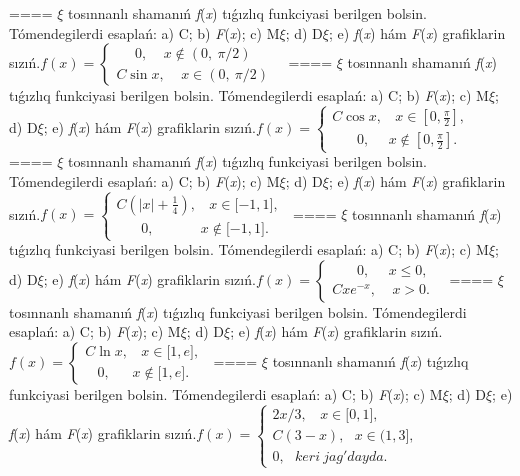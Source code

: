 ====
$\xi$ tosınnanlı shamanıń \emph{f}(\emph{x}) tıǵızlıq funkciyasi berilgen bolsin. Tómendegilerdi esaplań: a) C; b) \emph{F}(\emph{x}); c) M$\xi$; d) D$\xi$; e) \emph{f}(\emph{x}) hám \emph{F}(\emph{x}) grafiklarin sızıń.\(f(x) = \left\{ \begin{matrix}
\ \ \ \ \ \ 0,\ \ \ \ \ x \notin (0,\ \pi/2)\ \  \\
C\sin x,\ \ \ \ \ x \in (0,\ \pi/2)\ \ 
\end{matrix} \right.\ \)
====
$\xi$ tosınnanlı shamanıń \emph{f}(\emph{x}) tıǵızlıq funkciyasi berilgen bolsin. Tómendegilerdi esaplań: a) C; b) \emph{F}(\emph{x}); c) M$\xi$; d) D$\xi$; e) \emph{f}(\emph{x}) hám \emph{F}(\emph{x}) grafiklarin sızıń.\(f(x) = \left\{ \begin{matrix}
C\cos x,\ \ \ \ x \in \left\lbrack 0,\frac{\pi}{2} \right\rbrack, \\
\ \ \ \ \ \ \ \ 0,\ \ \ \ \ \ x \notin \left\lbrack 0,\frac{\pi}{2} \right\rbrack.\ \ 
\end{matrix} \right.\ \)
====
$\xi$ tosınnanlı shamanıń \emph{f}(\emph{x}) tıǵızlıq funkciyasi berilgen bolsin. Tómendegilerdi esaplań: a) C; b) \emph{F}(\emph{x}); c) M$\xi$; d) D$\xi$; e) \emph{f}(\emph{x}) hám \emph{F}(\emph{x}) grafiklarin sızıń.\(f(x) = \left\{ \begin{matrix}
C\left( |x| + \frac{1}{4} \right),\ \ \ \ x \in \lbrack - 1,1\rbrack, \\
\ \ \ \ \ \ \ \ 0,\ \ \ \ \ \ \ \ \ \ \ \ \ \ \ x \notin \lbrack - 1,1\rbrack.\ \ 
\end{matrix} \right.\ \)
====
$\xi$ tosınnanlı shamanıń \emph{f}(\emph{x}) tıǵızlıq funkciyasi berilgen bolsin. Tómendegilerdi esaplań: a) C; b) \emph{F}(\emph{x}); c) M$\xi$; d) D$\xi$; e) \emph{f}(\emph{x}) hám \emph{F}(\emph{x}) grafiklarin sızıń.\(f(x) = \left\{ \begin{matrix}
\ \ \ \ \ \ \ \ 0,\ \ \ \ \ \ x \leq 0, \\
Cxe^{- x},\ \ \ \ \ x > 0.\ \ 
\end{matrix} \right.\ \)
====
$\xi$ tosınnanlı shamanıń \emph{f}(\emph{x}) tıǵızlıq funkciyasi berilgen bolsin. Tómendegilerdi esaplań: a) C; b) \emph{F}(\emph{x}); c) M$\xi$; d) D$\xi$; e) \emph{f}(\emph{x}) hám \emph{F}(\emph{x}) grafiklarin sızıń.\(f(x) = \left\{ \begin{matrix}
C\ln x,\ \ \ \ x \in \lbrack 1,e\rbrack, \\
\ \ \ \ 0,\ \ \ \ \ \ \ x \notin \lbrack 1,e\rbrack.\ \ 
\end{matrix} \right.\ \)
====
$\xi$ tosınnanlı shamanıń \emph{f}(\emph{x}) tıǵızlıq funkciyasi berilgen bolsin. Tómendegilerdi esaplań: a) C; b) \emph{F}(\emph{x}); c) M$\xi$; d) D$\xi$; e) \emph{f}(\emph{x}) hám \emph{F}(\emph{x}) grafiklarin sızıń.\(f(x) = \left\{ \begin{matrix}
2x/3,\ \ \ \ x \in \lbrack 0,1\rbrack, \\
C(3 - x),\ \ \ x \in (1,3\rbrack, \\
0,\ \ \ keri\ jag'dayda.\ \ 
\end{matrix} \right.\ \)
